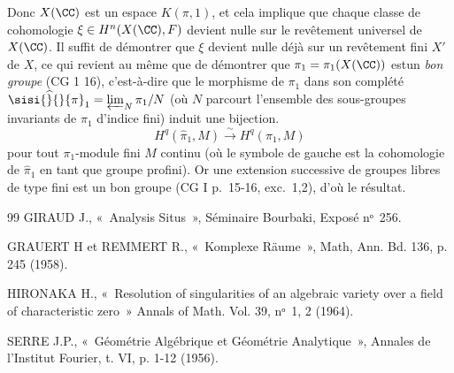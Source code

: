 \documentclass[10pt]{../fichiers-configuration-latex/smfart}
\begin{document}
Donc $X(\CC)$ est un espace $K(\pi,1)$, et cela implique que
chaque classe de cohomologie $\xi\in H^n(X(\CC),F)$ devient
nulle sur le revêtement universel de $X(\CC)$. Il suffit de
démontrer que $\xi$ devient nulle déjà sur un revêtement fini $X'$ de
$X$, ce qui revient au même que de démontrer que
$\pi_1=\pi_1(X(\CC))$ est\pageoriginale un \emph{bon groupe}
(\cf CG 1 16), %
 c'est-à-dire que le morphisme de $\pi_1$ dans son
complété $\sisi{\widehat}{}{\pi}_1=\varprojlim_N \pi_1/N$ (où $N$ parcourt l'ensemble des
sous-groupes invariants %
de $\pi_1$ d'indice fini) induit une
bijection.
$$
H^q(\widehat{\pi}_1,M)\xrightarrow{\sim} H^q(\pi_1,M)
$$
pour tout $\pi_1$-module fini $M$ continu (où le symbole de gauche est
la cohomologie de $\widehat{\pi}_1$ en tant que groupe profini). Or
une extension successive de groupes libres de type fini est un bon
groupe (\cf CG I p.~15-16, exc.~1,2), d'où le résultat. %

\begin{thebibliography}{99}
 GIRAUD J., « Analysis Situs », Séminaire
Bourbaki, Exposé nᵒ 256.

 GRAUERT H et REMMERT R., « Komplexe Räume »,
Math, Ann. Bd. 136, p. 245 (1958).

 HIRONAKA H., « Resolution of singularities of an
algebraic variety over a field of characteristic zero » Annals of
Math. Vol. 39, nᵒ 1, 2 (1964).

 SERRE J.P., « Géométrie Algébrique et Géométrie
Analytique », Annales de l'Institut Fourier, t. VI, p. 1-12 (1956).
\end{thebibliography}


\ifx\danslelivre\undefined
\end{document}
